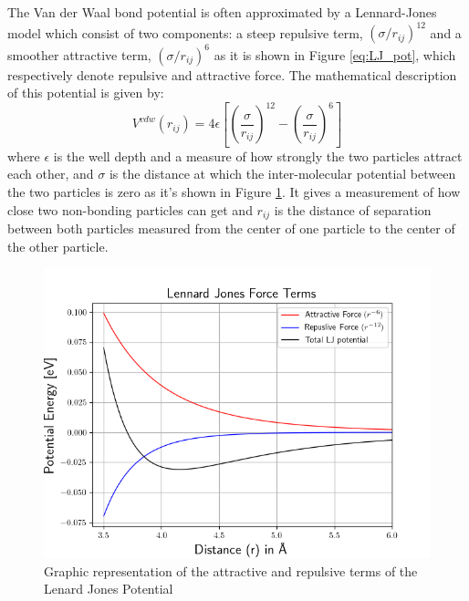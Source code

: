 The Van der Waal bond potential is often approximated by a Lennard-Jones model which consist of two components: a steep repulsive term, $(\sigma/r_{ij})^{12}$ and a smoother attractive term, $(\sigma/r_{ij})^{6}$ as it is shown in Figure \ref{eq:LJ_pot}, which respectively denote repulsive and attractive force. The mathematical description of this potential is given by: 
\begin{equation}
    V^{vdw}(r_{ij})=4\epsilon\left [\left ( \frac{\sigma}{r_{ij}} \right )^{12}-\left (\frac{\sigma}{r_{ij}} \right )^{6} \right ] 
    \label{eq:LJ_pot} 
\end{equation}
where $\epsilon$ is the well depth and a measure of how strongly the two particles attract each other, and $\sigma$ is the distance at which the inter-molecular potential between the two particles is zero as it's shown in Figure \ref{fig:LJ_1}. It gives a measurement of how close two non-bonding particles can get and $r_{ij}$ is the distance of separation between both particles measured from the center of one particle to the center of the other particle.
\begin{figure}[h]
    \centering
    \includegraphics[scale=0.6]{Figures/Chapter2/LJ_1.png}
    \caption{Graphic representation of the attractive and repulsive terms of the Lenard Jones Potential}
    \label{fig:LJ_1}
\end{figure}

